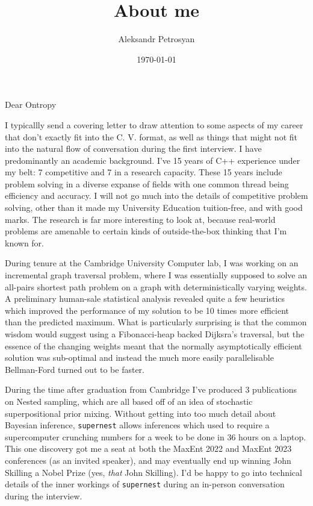 \documentclass[11pt]{scrlttr2}
\author{Aleksandr Petrosyan}
\date{\today}
\title{About me}
\begin{document}
\begin{letter}{
}

\opening{Dear Ontropy}

I typicallly send a covering letter to draw attention to some aspects
of my career that don't exactly fit into the C. V. format, as well as
things that might not fit into the natural flow of conversation during
the first interview. I have predominantly an academic background. I've
15 years of C++ experience under my belt: 7 competitive and 7 in a
research capacity. These 15 years include problem solving in a diverse
expanse of fields with one common thread being efficiency and
accuracy. I will not go much into the details of competitive problem
solving, other than it made my University Education tuition-free, and
with good marks. The research is far more interesting to look at,
because real-world problems are amenable to certain kinds of
outside-the-box thinking that I'm known for.

During tenure at the Cambridge University Computer lab, I was working
on an incremental graph traversal problem, where I was essentially
supposed to solve an all-pairs shortest path problem on a graph with
deterministically varying weights. A preliminary human-sale
statistical analysis revealed quite a few heuristics which improved
the performance of my solution to be 10 times more efficient than the
predicted maximum. What is particularly surprising is that the common
wisdom would suggest using a Fibonacci-heap backed Dijksra's
traversal, but the essence of the changing weights meant that the
normally asymptotically efficient solution was sub-optimal and instead
the much more easily parallelisable Bellman-Ford turned out to be
faster.

During the time after graduation from Cambridge I've produced 3
publications on Nested sampling, which are all based off of an idea of
stochastic superpositional prior mixing. Without getting into too much
detail about Bayesian inference, \texttt{supernest} allows inferences
which used to require a supercomputer crunching numbers for a week to
be done in 36 hours on a laptop. This one discovery got me a seat at
both the MaxEnt 2022 and MaxEnt 2023 conferences (as an invited
speaker), and may eventually end up winning John Skilling a Nobel
Prize (yes, \emph{that} John Skilling). I'd be happy to go into
technical details of the inner workings of \texttt{supernest} during
an in-person conversation during the interview. 


\end{letter}
\end{document}
